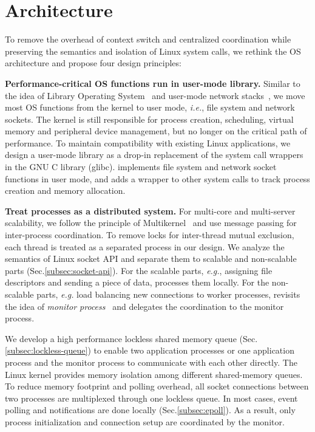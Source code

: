 \section{Architecture}
\label{sec:design}

To remove the overhead of context switch and centralized coordination while preserving the semantics and isolation of Linux system calls, we rethink the OS architecture and propose four design principles:

\textbf{Performance-critical OS functions run in user-mode library.}
Similar to the idea of Library Operating System~ and user-mode network stacks~, we move most OS functions from the kernel to user mode, \textit{i.e.}, file system and network sockets. The kernel is still responsible for process creation, scheduling, virtual memory and peripheral device management, but no longer on the critical path of performance. To maintain compatibility with existing Linux applications, we design a user-mode library \libipc as a drop-in replacement of the system call wrappers in the GNU C library (glibc). \libipc implements file system and network socket functions in user mode, and adds a wrapper to other system calls to track process creation and memory allocation.

\textbf{Treat processes as a distributed system.}
For multi-core and multi-server scalability, we follow the principle of Multikernel~\cite{baumann2009multikernel} and use message passing for inter-process coordination. To remove locks for inter-thread mutual exclusion, each thread is treated as a separated process in our design. We analyze the semantics of Linux socket API and separate them to scalable and non-scalable parts (Sec.\ref{subsec:socket-api}). For the scalable parts, \textit{e.g.}, assigning file descriptors and sending a piece of data, \libipc processes them locally. For the non-scalable parts, \textit{e.g.} load balancing new connections to worker processes, \libipc revisits the idea of \textit{monitor process}~ and delegates the coordination to the monitor process.

We develop a high performance lockless shared memory queue (Sec.\ref{subsec:lockless-queue}) to enable two application processes or one application process and the monitor process to communicate with each other directly. The Linux kernel provides memory isolation among different shared-memory queues. To reduce memory footprint and polling overhead, all socket connections between two processes are multiplexed through one lockless queue. In most cases, event polling and notifications are done locally (Sec.\ref{subsec:epoll}). As a result, only process initialization and connection setup are coordinated by the monitor.

